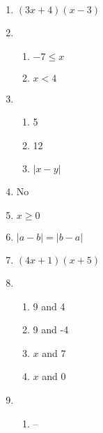 \documentclass{article}
\begin{document}
\begin{enumerate}
\begin{enumerate}
	\end{enumerate}
	
\item $(3x + 4)(x - 3)$

\item

	\begin{enumerate}
	
	\item $-7 \leq x$
	
	\item $x < 4$
	
	\end{enumerate}
	
\item

	\begin{enumerate}
	
	\item 5
	
	\item 12
	
	\item $|x - y|$
	
	\end{enumerate}
	
\item No

\item $x \geq 0$

\item $|a - b| = |b - a|$

\item $(4x + 1)(x + 5)$

\item

	\begin{enumerate}
	
	\item 9 and 4
	
	\item 9 and -4
	
	\item $x$ and 7
	
	\item $x$ and 0
	
	\end{enumerate}
	
\item

	\begin{enumerate}
	
	\item --
	

\end{enumerate}
\end{enumerate}
\end{document}
